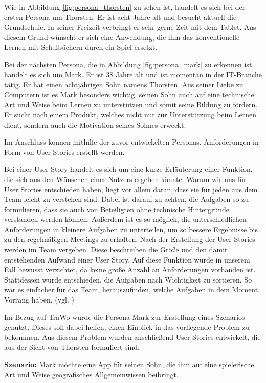 Wie in Abbildung \ref{fig:persona_thorsten} zu sehen ist, handelt es sich bei der ersten Persona um Thorsten. Er ist acht Jahre alt und besucht aktuell die Grundschule. In seiner Freizeit verbringt er sehr gerne Zeit mit dem Tablet. Aus diesem Grund wünscht er sich eine Anwendung, die ihm das konventionelle Lernen mit Schulbüchern durch ein Spiel ersetzt.

Bei der nächsten Persona, die in Abbildung \ref{fig:persona_mark} zu erkennen ist, handelt es sich um Mark. Er ist 38 Jahre alt und ist momentan in der IT-Branche tätig. Er hat einen achtjährigen Sohn namens Thorsten. Aus seiner Liebe zu Computern ist es Mark besonders wichtig, seinen Sohn auch auf eine technische Art und Weise beim Lernen zu unterstützen und somit seine Bildung zu fördern. Er sucht nach einem Produkt, welches nicht nur zur Unterstützung beim Lernen dient, sondern auch die Motivation seines Sohnes erweckt.

Im Anschluss können mithilfe der zuvor entwickelten Personas, Anforderungen in Form von User Stories erstellt werden.

Bei einer User Story handelt es sich um eine kurze Erläuterung einer Funktion, die sich aus den Wünschen eines Nutzers ergeben könnte. Warum wir uns für User Stories entschieden haben, liegt vor allem daran, dass sie für jeden aus dem Team leicht zu verstehen sind. Dabei ist darauf zu achten, die Aufgaben so zu formulieren, dass sie auch von Beteiligten ohne technische Hintergründe verstanden werden können. Außerdem ist es so möglich, die unterschiedlichen Anforderungen in kleinere Aufgaben zu unterteilen, um so bessere Ergebnisse bis zu den regelmäßigen Meetings zu erhalten. Nach der Erstellung der User Stories werden im Team  vergeben. Diese beschreiben die Größe und den damit entstehenden Aufwand einer User Story. Auf diese Funktion wurde in unserem Fall bewusst verzichtet, da keine große Anzahl an Anforderungen vorhanden ist. Stattdessen wurde entschieden, die Aufgaben nach Wichtigkeit zu sortieren. So war es einfacher für das Team, herauszufinden, welche Aufgaben in dem Moment Vorrang haben. (vgl. \cite{UserStories})

Im Bezug auf TraWo wurde die Persona Mark zur Erstellung eines Szenarios genutzt. Dieses soll dabei helfen, einen Einblick in das vorliegende Problem zu bekommen. Aus diesem Problem wurden anschließend User Stories entwickelt, die aus der Sicht von Thorsten formuliert sind.

\textbf{Szenario:}
Mark möchte eine App für seinen Sohn, die ihm auf eine spielerische Art und Weise geografisches Allgemeinwissen beibringt.

